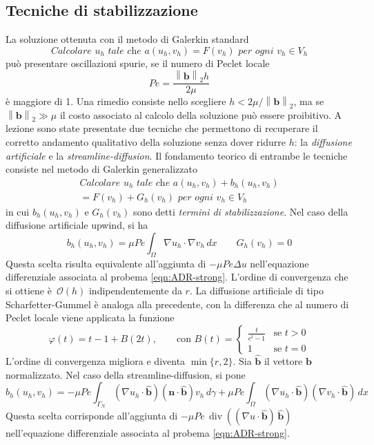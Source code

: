 \documentclass[a4paper]{article}
\renewcommand{\vec}[1]{\mathbf{#1}}
\DeclareMathOperator{\diver}{div}
\newcommand{\bhat}{\hat{\vec{b}}}
\newcommand{\bigO}[1]{\mathcal{O}\!\left(#1\right)}
\newcommand{\dx}{\, dx}
\newcommand{\dgamma}{\, d\gamma}
\newcommand{\normtwo}[1]{\left\lVert#1\right\rVert_2}
\begin{document}
\subsection{Tecniche di stabilizzazione}
La soluzione ottenuta con il metodo di Galerkin standard
\[
\textit{Calcolare $u_h$ tale che $a(u_h,v_h) = F(v_h)$ per ogni $v_h \in V_h$}
\]
può presentare oscillazioni spurie, se il numero di Peclet locale
\[
Pe = \frac{\normtwo{\vec{b}}h}{2\mu}
\]
è maggiore di 1. Una rimedio consiste nello scegliere
$h < 2\mu/\normtwo{\vec{b}}$, ma se $\normtwo{\vec{b}} \gg \mu$
il costo associato al calcolo della soluzione può essere proibitivo.
A lezione sono state presentate due tecniche che permettono di recuperare
il corretto andamento qualitativo della soluzione senza dover ridurre $h$:
la \emph{diffusione artificiale} e la \emph{streamline-diffusion}.
Il fondamento teorico di entrambe le tecniche consiste nel
metodo di Galerkin generalizzato
\begin{gather*}
\textit{Calcolare $u_h$ tale che $a(u_h,v_h) + b_h(u_h,v_h)$} \\
\textit{$= F(v_h) + G_h(v_h)$ per ogni $v_h \in V_h$}
\end{gather*}
in cui $b_h(u_h,v_h)$ e $G_h(v_h)$ sono detti
\emph{termini di stabilizzazione}.
Nel caso della diffusione artificiale upwind, si ha
\[
b_h(u_h,v_h) = \mu Pe \int_\Omega{\nabla u_h \cdot \nabla v_h \dx} \qquad G_h(v_h) = 0
\]
Questa scelta risulta equivalente all'aggiunta di $-\mu Pe \Delta u$ nell'equazione
differenziale associata al probema \eqref{eqn:ADR-strong}.
L'ordine di convergenza che si ottiene è~$\bigO{h}$ indipendentemente da $r$.
La diffusione artificiale di tipo Scharfetter-Gummel è analoga alla precedente,
con la differenza che al numero di Peclet locale viene applicata la funzione
\[
\varphi(t) = t - 1 + B(2t), \qquad \text{con $B(t) =$}
\begin{cases}
\frac{t}{e^t - 1} & \text{se $t > 0$} \\
1                 & \text{se $t = 0$}
\end{cases}
\]
L'ordine di convergenza migliora e diventa $\min\{r,2\}$.
Sia $\bhat$ il vettore $\vec{b}$ normalizzato.
Nel caso della streamline-diffusion, si pone
\[
b_h(u_h,v_h) =
- \mu Pe \int_{\Gamma_N}{(\nabla u_h \cdot \bhat) (\vec{n} \cdot \bhat) v_h \dgamma}
+ \mu Pe \int_\Omega{(\nabla u_h \cdot \bhat) (\nabla v_h \cdot \bhat) \dx}
\]
Questa scelta corrisponde all'aggiunta di
$-\mu Pe \, \diver((\nabla u \cdot \bhat) \, \bhat)$
nell'equazione differenziale associata al probema \eqref{eqn:ADR-strong}.
\end{document}
